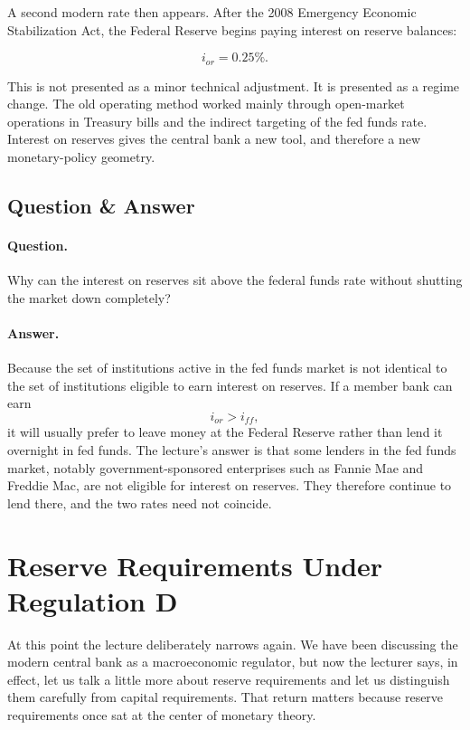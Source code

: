 A second modern rate then appears. After the 2008 Emergency Economic Stabilization Act, the Federal Reserve begins paying interest on reserve balances:

\begin{equation}
i_{or} = 0.25\%.
\end{equation}

This is not presented as a minor technical adjustment. It is presented as a regime change. The old operating method worked mainly through open-market operations in Treasury bills and the indirect targeting of the fed funds rate. Interest on reserves gives the central bank a new tool, and therefore a new monetary-policy geometry.

\subsection{Question \& Answer}

\paragraph{Question.} Why can the interest on reserves sit above the federal funds rate without shutting the market down completely?

\paragraph{Answer.} Because the set of institutions active in the fed funds market is not identical to the set of institutions eligible to earn interest on reserves. If a member bank can earn
\[
i_{or} > i_{ff},
\]
it will usually prefer to leave money at the Federal Reserve rather than lend it overnight in fed funds. The lecture's answer is that some lenders in the fed funds market, notably government-sponsored enterprises such as Fannie Mae and Freddie Mac, are not eligible for interest on reserves. They therefore continue to lend there, and the two rates need not coincide.

\section{Reserve Requirements Under Regulation D}

At this point the lecture deliberately narrows again. We have been discussing the modern central bank as a macroeconomic regulator, but now the lecturer says, in effect, let us talk a little more about reserve requirements and let us distinguish them carefully from capital requirements. That return matters because reserve requirements once sat at the center of monetary theory.

